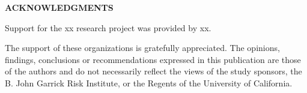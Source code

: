 \begin{center}
    {\fontsize{18pt}{0pt} \MakeUppercase{\textbf{acknowledgments}}}
    \vspace*{24pt}
\end{center}


Support for the xx research project was provided by xx.



The support of these organizations is gratefully appreciated. The opinions, findings, conclusions or recommendations expressed in this publication are those of the authors and do not necessarily reflect the views of the study sponsors, the B. John Garrick Risk Institute, or the Regents of the University of California.


